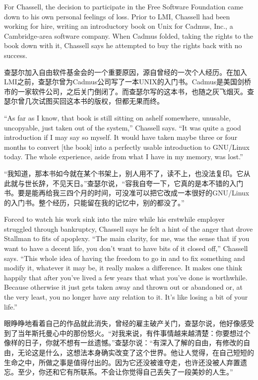 \ifdefined\eng
For Chassell, the decision to participate in the Free Software Foundation came down to his own personal feelings of loss. Prior to LMI, Chassell had been working for hire, writing an introductory book on Unix for Cadmus, Inc., a Cambridge-area software company. When Cadmus folded, taking the rights to the book down with it, Chassell says he attempted to buy the rights back with no success.
\fi

\ifdefined\chs
查瑟尔加入自由软件基金会的一个重要原因，源自曾经的一次个人经历。在加入LMI之前，查瑟尔曾为Cadmus公司写了一本UNIX的入门书。Cadmus是美国剑桥市的一家软件公司，之后关门倒闭了。而查瑟尔写的这本书，也随之灰飞烟灭。查瑟尔曾几次试图买回这本书的版权，但都无果而终。
\fi

\ifdefined\eng
``As far as I know, that book is still sitting on \ifdefined\vtwo a\fi shelf somewhere, unusable, uncopyable, just taken out of the system,'' Chassell says. ``It was quite a good introduction if I may say so myself. It would have taken maybe three or four months to convert [the book] into a perfectly usable introduction to GNU/Linux today. The whole experience, aside from what I have in my memory, was lost.''
\fi

\ifdefined\chs
``我知道，那本书如今就在某个书架上，别人用不了，读不上，也没法复印。它从此就与世长辞，不见天日。''查瑟尔说，``容我自夸一下，它真的是本不错的入门书。要是能再给我三四个月的时间，可没准可以把它改成一本很好的GNU/Linux的入门书。整个经历，只能留在我的记忆中，别的都没了。''
\fi

\ifdefined\eng
Forced to watch his work sink into the mire while his erstwhile employer struggled through bankruptcy, Chassell says he felt a hint of the anger that drove Stallman to fits of apoplexy. ``The main clarity, for me, was the sense that if you want to have a decent life, you don't want to have bits of it closed off,'' Chassell says. ``This whole idea of having the freedom to go in and to fix something and modify it, whatever it may be, it really makes a difference. It makes one think happily that after you've lived a few years that what you've done is worthwhile. Because otherwise it just gets taken away and thrown out or abandoned or, at the very least, you no longer have any relation to it. It's like losing a bit of your life.''
\fi

\ifdefined\chs
眼睁睁地看着自己的作品就此消失，曾经的雇主破产关门，查瑟尔说，他好像感受到了当年斯托曼心中的那份怒火。``对我来说，有件事情越来越清楚：你要想过个像样的日子，你就不想有一丝遗憾。''查瑟尔说：``有深入了解的自由，有修改的自由，无论这是什么，这想法本身确实改变了这个世界。他让人觉得，在自己短短的生命之中，所做之事是值得付出的。因为它还没被谁夺走，也许还没被人弃置遗忘。至少，你还和它有所联系。不会让你觉得自己丢失了一段美妙的人生。''
\fi

\bigskip

\theendnotes
\setcounter{endnote}{0
}
